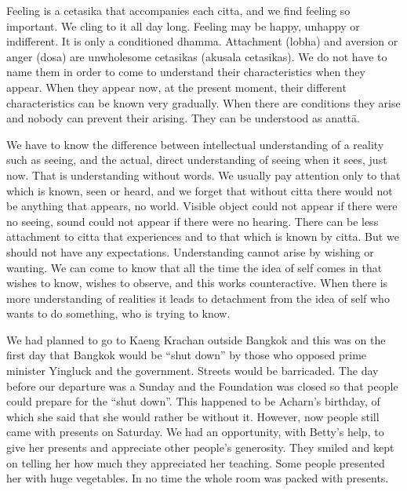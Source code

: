 Feeling is a cetasika that accompanies each citta, and we find feeling
so important. We cling to it all day long. Feeling may be happy, unhappy
or indifferent. It is only a conditioned dhamma. Attachment (lobha) and
aversion or anger (dosa) are unwholesome cetasikas (akusala cetasikas).
We do not have to name them in order to come to understand their
characteristics when they appear. When they appear now, at the present
moment, their different characteristics can be known very gradually.
When there are conditions they arise and nobody can prevent their
arising. They can be understood as anattā.

We have to know the difference between intellectual understanding of a
reality such as seeing, and the actual, direct understanding of seeing
when it sees, just now. That is understanding without words. We usually
pay attention only to that which is known, seen or heard, and we forget
that without citta there would not be anything that appears, no world.
Visible object could not appear if there were no seeing, sound could not
appear if there were no hearing. There can be less attachment to citta
that experiences and to that which is known by citta. But we should not
have any expectations. Understanding cannot arise by wishing or wanting.
We can come to know that all the time the idea of self comes in that
wishes to know, wishes to observe, and this works counteractive. When
there is more understanding of realities it leads to detachment from the
idea of self who wants to do something, who is trying to know.

We had planned to go to Kaeng Krachan outside Bangkok and this was on
the first day that Bangkok would be ``shut down'' by those who opposed
prime minister Yingluck and the government. Streets would be barricaded.
The day before our departure was a Sunday and the Foundation was closed
so that people could prepare for the ``shut down''. This happened to be
Acharn's birthday, of which she said that she would rather be without
it. However, now people still came with presents on Saturday. We had an
opportunity, with Betty's help, to give her presents and appreciate
other people's generosity. They smiled and kept on telling her how much
they appreciated her teaching. Some people presented her with huge
vegetables. In no time the whole room was packed with presents.

